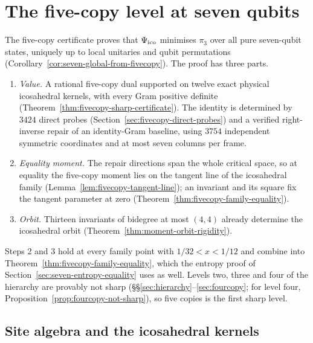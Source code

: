 \section{The five-copy level at seven qubits}\label{sec:fivecopy}
The five-copy certificate proves that $\Psi_{\rm ico}$ minimises $\pi_3$ over all pure
seven-qubit states, uniquely up to local unitaries and qubit permutations
(Corollary~\ref{cor:seven-global-from-fivecopy}). The proof has three
parts.
\begin{enumerate}
\item \emph{Value.} A rational five-copy dual supported on twelve exact
  physical icosahedral kernels, with every Gram positive definite
  (Theorem~\ref{thm:fivecopy-sharp-certificate}). The identity is determined by
  $3424$ direct probes (Section~\ref{sec:fivecopy-direct-probes}) and a
  verified right-inverse repair of an identity-Gram baseline, using $3754$
  independent symmetric coordinates and at most seven columns per frame.
\item \emph{Equality moment.} The repair directions span the whole
  critical space, so at equality the five-copy moment lies on the
  tangent line of the icosahedral family
  (Lemma~\ref{lem:fivecopy-tangent-line}); an invariant and its square
  fix the tangent parameter at zero
  (Theorem~\ref{thm:fivecopy-family-equality}).
\item \emph{Orbit.} Thirteen invariants of bidegree at most $(4,4)$
  already determine the icosahedral orbit
  (Theorem~\ref{thm:moment-orbit-rigidity}).
\end{enumerate}
Steps 2 and 3 hold at every family point with $1/32<x<1/12$ and combine into
Theorem~\ref{thm:fivecopy-family-equality}, which the entropy proof of
Section~\ref{sec:seven-entropy-equality} uses as well.
Levels two, three and four of the hierarchy are provably not sharp
(\S\S\ref{sec:hierarchy}--\ref{sec:fourcopy}; for level four,
Proposition~\ref{prop:fourcopy-not-sharp}), so five copies is the first
sharp level.

\subsection{Site algebra and the icosahedral kernels}\label{sec:fivecopy-kernels}

